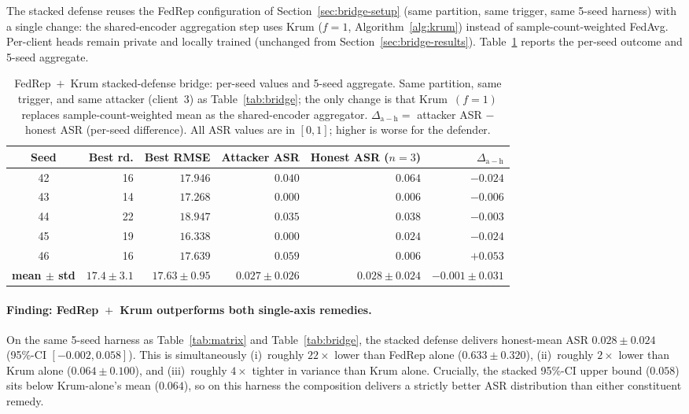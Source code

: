 \documentclass[a4paper,fleqn,doubleblind]{cas-sc}
\newcommand{\tblhead}{\rowcolor{tblHeadBg}}
\newcommand{\zebra}{\rowcolors{2}{tblAltBg}{white}}
\newcommand{\tblhead}{}
\newcommand{\zebra}{}
\begin{document}
The stacked defense reuses the FedRep configuration of
Section~\ref{sec:bridge-setup} (same partition, same trigger, same
5-seed harness) with a single change: the shared-encoder aggregation
step uses Krum ($f = 1$, Algorithm~\ref{alg:krum}) instead of
sample-count-weighted FedAvg. Per-client heads remain private and
locally trained (unchanged from Section~\ref{sec:bridge-results}).
Table~\ref{tab:stacked} reports the per-seed outcome and 5-seed
aggregate.

\begin{table}[pos=tbp]
\centering
\footnotesize
\setlength{\tabcolsep}{4pt}
\renewcommand{\arraystretch}{1.15}
\caption{FedRep~$+$~Krum stacked-defense bridge: per-seed values
and 5-seed aggregate. Same partition, same trigger, and same
attacker (client~3) as Table~\ref{tab:bridge}; the only change is
that Krum~$(f = 1)$ replaces sample-count-weighted mean as the
shared-encoder aggregator.
$\Delta_{\mathrm{a-h}} = $ attacker ASR $-$ honest ASR (per-seed
difference). All ASR values are in $[0, 1]$; higher is worse for
the defender.}
\label{tab:stacked}
\zebra
\begin{tabular}{@{}crrrrr@{}}
\toprule
\tblhead
Seed & Best rd. & Best RMSE & Attacker ASR & Honest ASR ($n{=}3$) & $\Delta_{\mathrm{a-h}}$ \\
\midrule
42 & 16 & $17.946$ & $0.040$ & $0.064$ & $-0.024$ \\
43 & 14 & $17.268$ & $0.000$ & $0.006$ & $-0.006$ \\
44 & 22 & $18.947$ & $0.035$ & $0.038$ & $-0.003$ \\
45 & 19 & $16.338$ & $0.000$ & $0.024$ & $-0.024$ \\
46 & 16 & $17.639$ & $0.059$ & $0.006$ & $+0.053$ \\
\midrule
\textbf{mean $\pm$ std} & $\mathbf{17.4 \pm 3.1}$ & $\mathbf{17.63 \pm 0.95}$ & $\mathbf{0.027 \pm 0.026}$ & $\mathbf{0.028 \pm 0.024}$ & $\mathbf{-0.001 \pm 0.031}$ \\
\bottomrule
\end{tabular}
\end{table}

\paragraph{Finding: FedRep~$+$~Krum outperforms both single-axis remedies.}
On the same 5-seed harness as Table~\ref{tab:matrix} and
Table~\ref{tab:bridge}, the stacked defense delivers honest-mean
ASR $0.028 \pm 0.024$ (95\%-CI $[-0.002, 0.058]$). This is
simultaneously (i)~roughly $22\times$ lower than FedRep alone
($0.633 \pm 0.320$), (ii)~roughly $2\times$ lower than Krum alone
($0.064 \pm 0.100$), and (iii)~roughly $4\times$ tighter in variance
than Krum alone. Crucially, the stacked 95\%-CI upper bound
($0.058$) sits below Krum-alone's mean ($0.064$), so on this
harness the composition delivers a strictly better ASR distribution
than either constituent remedy.
\end{document}
